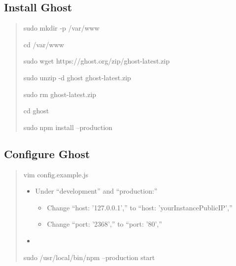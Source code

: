 \documentclass[a4paper]{report}
\begin{document}
    \subsection{Install Ghost}
      \begin{quotation}

        sudo mkdir -p /var/www

        cd /var/www

        sudo wget https://ghost.org/zip/ghost-latest.zip

        sudo unzip -d ghost ghost-latest.zip

        sudo rm ghost-latest.zip

        cd ghost

        sudo npm install --production

      \end{quotation}

    \subsection{Configure Ghost}
      \begin{quotation}
        vim config.example.js
        \begin{itemize}
          \item Under ``development'' and ``production:''
            \begin{itemize}
              \item Change ``host: '127.0.0.1','' to ``host: 'yourInstancePublicIP',''
              \item Change ``port: '2368','' to ``port: '80',''
            \end{itemize}
          \item
        \end{itemize}
        sudo /usr/local/bin/npm --production start
      \end{quotation}
\end{document}
